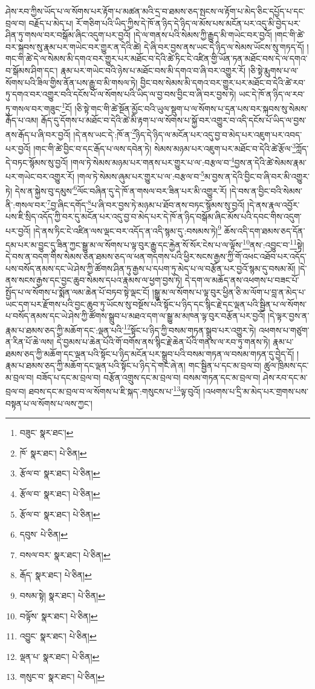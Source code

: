 ཤེས་རབ་ཀྱིས་ཡོད་པ་ལ་སོགས་པར་རྟོག་པ་མཚན་མའི་དྲ་བ་ཐམས་ཅད་སྤངས་ལ་རྟོག་པ་མེད་ཅིང་དཔྱོད་པ་དང་བྲལ་བ། བརྗོད་པ་མེད་པ། རོ་གཅིག་པའི་ཡིད་ཀྱིས་དེ་ཁོ་ན་ཉིད་དེ་ཉིད་ལ་མོས་པས་མངོན་པར་འདུ་མི་བྱེད་པར་ཤིན་ཏུ་གསལ་བར་བསྒོམ་ཞིང་འདུག་པར་བྱའོ། །དེ་ལ་གནས་པའི་སེམས་ཀྱི་རྒྱུད་མི་གཡེང་བར་བྱའོ། །གང་གི་ཚེ་བར་སྐབས་སུ་རྣམ་པར་གཡེང་བར་གྱུར་ན་དེའི་ཚེ། དེ་ཞི་བར་བྱས་ནས་ཡང་དེ་ཉིད་ལ་སེམས་ཡོངས་སུ་གཏད་དོ། །གང་གི་ཚེ་དེ་ལ་སེམས་མི་དགའ་བར་གྱུར་པར་མཐོང་བ་དེའི་ཚེ་ཏིང་ངེ་འཛིན་གྱི་ཡོན་ཏན་མཐོང་བས་དེ་ལ་དགའ་བ་སྒོམས་ཤིག་དང་། རྣམ་པར་གཡེང་བའི་ཉེས་པ་མཐོང་བས་མི་དགའ་བ་ཞི་བར་འགྱུར་རོ། །ཅི་སྟེ་རྨུགས་པ་ལ་སོགས་པའི་ཟིལ་གྱིས་ནོན་པས་རྒྱུ་བ་མི་གསལ་ཏེ། བྱིང་བས་སེམས་མི་དགའ་བར་གྱུར་པར་མཐོང་བ་དེའི་ཚེ་རབ་ཏུ་དགའ་བར་འགྱུར་བའི་དངོས་པོ་ལ་སོགས་པའི་ཡིད་ལ་བྱ་བས་བྱིང་བ་ཞི་བར་བྱས་ཏེ། ཡང་དེ་ཁོ་ན་ཉིད་ལ་རབ་ཏུ་གསལ་བར་གཟུང་\footnote{བཟུང་  སྣར་ཐང་། }ངོ། །ཅི་སྟེ་གང་གི་ཚེ་སྔོན་མྱོང་བའི་ཡུལ་སྡུག་པ་ལ་སོགས་པ་དྲན་པས་བར་སྐབས་སུ་སེམས་རྒོད་པ་འམ། རྒོད་དུ་དོགས་པ་མཐོང་བ་དེའི་ཚེ་མི་རྟག་པ་ལ་སོགས་པ་སྐྱོ་བར་འགྱུར་བ་འདི་དངོས་པོ་ཡིད་ལ་བྱས་ནས་རྒོད་པ་ཞི་བར་བྱའོ། །དེ་ནས་ཡང་དེ་:ཁོ་ན་\footnote{ཁོ་  སྣར་ཐང་།  པེ་ཅིན། }ཉིད་དེ་ཉིད་ལ་མངོན་པར་འདུ་བྱ་བ་མེད་པར་འཇུག་པར་འབད་པར་བྱའོ། །གང་གི་ཚེ་བྱིང་བ་དང་རྒོད་པ་ལས་དབེན་ཏེ། སེམས་མཉམ་པར་འཇུག་པར་མཐོང་བ་དེའི་ཚེ་རྩོལ་\footnote{རྩོལ་བ་  སྣར་ཐང་།  པེ་ཅིན། }ཀློད་དེ་བཏང་སྙོམས་སུ་བྱའོ། །གལ་ཏེ་སེམས་མཉམ་པར་གནས་པར་གྱུར་པ་ལ་:བརྩལ་བ་\footnote{རྩོལ་བ་  སྣར་ཐང་།  པེ་ཅིན། }བྱས་ན་དེའི་ཚེ་སེམས་རྣམ་པར་གཡེང་བར་འགྱུར་རོ། །གལ་ཏེ་སེམས་ཞུམ་པར་གྱུར་པ་ལ་:བརྩལ་བ་\footnote{རྩོལ་བ་  སྣར་ཐང་།  པེ་ཅིན། }མ་བྱས་ན་དེའི་བྱིང་བ་ཞི་བར་མི་འགྱུར་ཏེ། དེས་ན་སྐྱེས་བུ་དམུས་\footnote{དབུས་  པེ་ཅིན། }ལོང་བཞིན་དུ་དེ་ཁོ་ན་གསལ་བར་ཟིན་པར་མི་འགྱུར་རོ། །དེ་བས་ན་བྱིང་བའི་སེམས་ནི་:གསལ་བར་\footnote{བསལ་བར་  སྣར་ཐང་།  པེ་ཅིན། }བྱ་ཞིང་དགོད་\footnote{རྒོད་  སྣར་ཐང་།  པེ་ཅིན། }པ་ཞི་བར་བྱས་ཏེ་མཉམ་པ་ཐོབ་ནས་བཏང་སྙོམས་སུ་བྱའོ། །དེ་ནས་རྣལ་འབྱོར་པས་ཇི་སྲིད་འདོད་ཀྱི་བར་དུ་མངོན་པར་འདུ་བྱ་བ་མེད་པར་དེ་ཁོ་ན་ཉིད་བསྒོམ་ཞིང་མོས་པའི་དབང་གིས་འདུག་པར་བྱའོ། །དེ་ནས་ཏིང་ངེ་འཛིན་ལས་ལྡང་བར་འདོད་ན་འདི་སྙམ་དུ་:བསམས་ཏེ།\footnote{བསམ་སྟེ།  སྣར་ཐང་།  པེ་ཅིན། } ཆོས་འདི་དག་ཐམས་ཅད་དོན་དམ་པར་མ་བྱུང་དུ་ཟིན་ཀྱང་སྒྱུ་མ་ལ་སོགས་པ་ལྟ་བུར་རྒྱུ་དང་རྐྱེན་སོ་སོར་ངེས་པ་ལ་ལྟོས་\footnote{བལྟོས་  སྣར་ཐང་།  པེ་ཅིན། }ནས་:འབྱུང་བ་\footnote{འབྱུང་  སྣར་ཐང་།  པེ་ཅིན། }སྟེ། དེ་བས་ན་བདག་གིས་སེམས་ཅན་ཐམས་ཅད་ལ་ཕན་གདགས་པའི་ཕྱིར་སངས་རྒྱས་ཀྱི་གོ་འཕང་འཐོབ་པར་འདོད་པས་བསོད་ནམས་དང་ཡེ་ཤེས་ཀྱི་ཚོགས་ཤིན་ཏུ་རྒྱས་པ་དཔག་ཏུ་མེད་པ་ལ་བརྩོན་པར་བྱའོ་སྙམ་དུ་བསམ་མོ། །དེ་ནས་སངས་རྒྱས་དང་བྱང་ཆུབ་སེམས་དཔའ་རྣམས་ལ་ཕྱག་བྱས་ཏེ། དེ་དག་ལ་མཆོད་ནས་འཕགས་པ་བཟང་པོ་སྤྱོད་པ་ལ་སོགས་པ་སྨོན་ལམ་ཆེན་པོ་བཏབ་སྟེ་ལྡང་ངོ། །སྒྱུ་མ་ལ་སོགས་པ་ལྟ་བུར་ཕྱིན་ཅི་མ་ལོག་པ་བླ་ན་མེད་པ་ཡང་དག་པར་རྫོགས་པའི་བྱང་ཆུབ་ཏུ་ཡོངས་སུ་བསྔོས་པའི་སྟོང་པ་ཉིད་དང་སྙིང་རྗེ་དང་ལྡན་པའི་སྦྱིན་པ་ལ་སོགས་པ་བསོད་ནམས་དང་ཡེ་ཤེས་ཀྱི་ཚོགས་སྒྲུབ་པ་མཐའ་དག་ལ་སྒྱུ་མ་མཁན་ལྟ་བུར་བརྩོན་པར་བྱའོ། །དེ་ལྟར་བྱས་ན་རྣམ་པ་ཐམས་ཅད་ཀྱི་མཆོག་དང་:ལྡན་པའི་\footnote{ལྡན་པ་  སྣར་ཐང་།  པེ་ཅིན། }སྟོང་པ་ཉིད་ཀྱི་བསམ་གཏན་སྒྲུབ་པར་འགྱུར་ཏེ། འཕགས་པ་གཙུག་ན་རིན་པོ་ཆེ་ལས། དེ་བྱམས་པ་ཆེན་པོའི་གོ་བགོས་ནས་སྙིང་རྗེ་ཆེན་པོའི་གནས་ལ་རབ་ཏུ་གནས་ཏེ། རྣམ་པ་ཐམས་ཅད་ཀྱི་མཆོག་དང་ལྡན་པའི་སྟོང་པ་ཉིད་མངོན་པར་སྒྲུབ་པའི་བསམ་གཏན་ལ་བསམ་གཏན་དུ་བྱེད་དོ། །རྣམ་པ་ཐམས་ཅད་ཀྱི་མཆོག་དང་ལྡན་པའི་སྟོང་པ་ཉིད་དེ་གང་ཞེ་ན། གང་སྦྱིན་པ་དང་མ་བྲལ་བ། ཚུལ་ཁྲིམས་དང་མ་བྲལ་བ། བཟོད་པ་དང་མ་བྲལ་བ། བརྩོན་འགྲུས་དང་མ་བྲལ་བ། བསམ་གཏན་དང་མ་བྲལ་བ། ཤེས་རབ་དང་མ་བྲལ་བ། ཐབས་དང་མ་བྲལ་བ་ལ་སོགས་པ་ཇི་སྐད་:གསུངས་པ་\footnote{གསུང་བ་  སྣར་ཐང་།  པེ་ཅིན། }ལྟ་བུའོ། །འཕགས་པ་དྲི་མ་མེད་པར་གྲགས་པས་བསྟན་པ་ལ་སོགས་པ་ལས་ཀྱང་། 